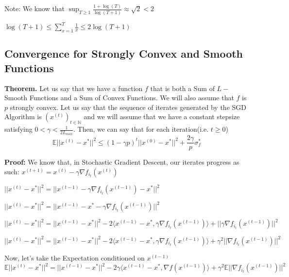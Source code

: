 Note: We know that $\sup_{T \geq 1} \frac{1 + \log(T)}{\log(T + 1)} \approx \sqrt{2} < 2$ \newline

$\log(T + 1) \leq \sum_{x=1}^{T} \frac{1}{x} \leq 2 \log(T + 1)$ \newline 



\subsection{Convergence for Strongly Convex and Smooth Functions}
\noindent \textbf{Theorem.} Let us say that we have a function $f$ that is both a Sum of $L-$Smooth Functions and a Sum of Convex Functions. We will also assume that $f$ is $p$ strongly convex. Let us say that the sequence of iterates generated by the SGD Algorithm is $(x^{(t)})_{t \in \mathbb{N}}$ and we will assume that we have a constant stepsize satisfying $0 < \gamma < \frac{1}{2L_{max}}$. Then, we can say that for each iteration(i.e. $t \geq 0$) 
\begin{equation}
    \mathbb{E}||x^{(t)} - x^*||^2 \leq (1 - \gamma p)^t ||x^{(0)} - x^*||^2 + \frac{2 \gamma}{p} \sigma_f^*
\end{equation}

\noindent \textbf{Proof:} \newline 
We know that, in Stochastic Gradient Descent, our iterates progress as such: $x^{(t + 1)}  = x^{(t)} - \gamma \nabla f_{i_t}(x^{(t)})$ \newline 

$||x^{(t)} - x^*||^2 = ||x^{(t - 1)} - \gamma \nabla f_{i_t}(x^{(t - 1)}) - x^*||^2$ \newline 

$||x^{(t)} - x^*||^2 = ||x^{(t - 1)} - x^* - \gamma \nabla f_{i_t}(x^{(t - 1)})||^2$ \newline 


$||x^{(t)} - x^*||^2 = ||x^{(t - 1)} - x^*||^2 - 2\langle x^{(t - 1)} - x^*,  \gamma \nabla f_{i_t}(x^{(t - 1)})\rangle + ||\gamma \nabla f_{i_t}(x^{(t - 1)})||^2$

$||x^{(t)} - x^*||^2 = ||x^{(t - 1)} - x^*||^2 - 2\langle x^{(t - 1)} - x^*,  \gamma \nabla f_{i_t}(x^{(t - 1)})\rangle + \gamma^2 ||\nabla f_{i_t}(x^{(t - 1)})||^2$

Now, let's take the Expectation conditioned on $x^{(t - 1)}$ \newline 
$\mathbb{E}||x^{(t)} - x^*||^2 = ||x^{(t - 1)} - x^*||^2 - 2\gamma \langle x^{(t - 1)} - x^*,  \nabla f(x^{(t - 1)})\rangle + \gamma^2 \mathbb{E} ||\nabla f_{i_t}(x^{(t - 1)})||^2$ \newline 



